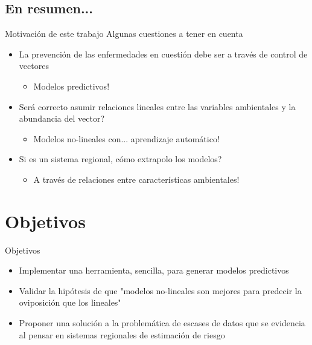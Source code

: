 \documentclass[10pt]{beamer}
\begin{document}
\subsection{En resumen...}


\begin{frame}{Motivación de este trabajo}
  Algunas cuestiones a tener en cuenta
  \pause
  \begin{itemize}[<+->]
   \item La prevención de las enfermedades en cuestión debe ser a través de control de vectores
   \begin{itemize}
     \item Modelos predictivos!
   \end{itemize}
   \item Será correcto asumir relaciones lineales entre las variables ambientales y la abundancia del vector?
   \begin{itemize}
     \item Modelos no-lineales con... aprendizaje automático!
   \end{itemize}
   \item Si es un sistema regional, cómo extrapolo los modelos?
   \begin{itemize}
     \item A través de relaciones entre características ambientales!
   \end{itemize}
  \end{itemize}

\end{frame}


\section{Objetivos}


\begin{frame}{Objetivos}
  \pause
  \begin{itemize}[<+->]
   \item Implementar una herramienta, sencilla, para generar modelos predictivos
   \item Validar la hipótesis de que "modelos no-lineales son mejores para predecir la oviposición que los lineales"
   \item Proponer una solución a la problemática de escases de datos que se evidencia al pensar en sistemas regionales de estimación de riesgo

  \end{itemize}

\end{frame}
\end{document}
